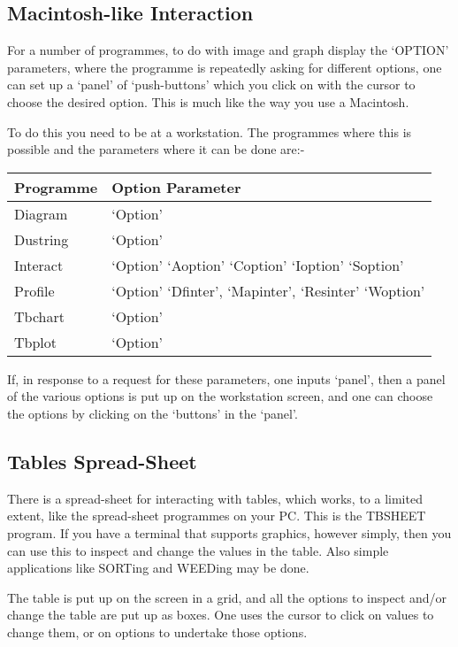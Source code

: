 \subsection{Macintosh-like Interaction} 

For a number of programmes, to do with image and graph display the `OPTION'
parameters, where the programme is repeatedly asking for different options,
one can set up a `panel' of `push-buttons' which you click on with the
cursor to choose the desired option. This is much like the way you use
a Macintosh.

To do this you need to be at a workstation. The programmes where this is
possible and the parameters where it can be done are:- 

\hspace{4ex}\begin{tabular}{|l|l|} \hline
Programme    & Option Parameter \\ \hline
Diagram &   `Option' \\
Dustring & `Option' \\
Interact  & `Option' `Aoption' `Coption' `Ioption' `Soption' \\
Profile & `Option' `Dfinter', `Mapinter', `Resinter' `Woption' \\
Tbchart  & `Option' \\
Tbplot & `Option' \\ \hline
\end{tabular}

If, in response to a request for these parameters, one inputs `panel', then
a panel of the various options is put up on the workstation screen, and one
can choose the options by clicking on the `buttons' in the `panel'.

\subsection{Tables Spread-Sheet}

There is a spread-sheet for interacting with tables, which works,
to a limited extent, like the spread-sheet programmes on your PC.
This is the TBSHEET program. If you have a terminal that supports
graphics, however simply, then you can use this to inspect and
change the values in the table. Also simple applications like
SORTing and WEEDing may be done.

The table is put up on the screen in a grid, and all the options
to inspect and/or change the table are put up as boxes. One uses
the cursor to click on values to change them, or on options to
undertake those options.

